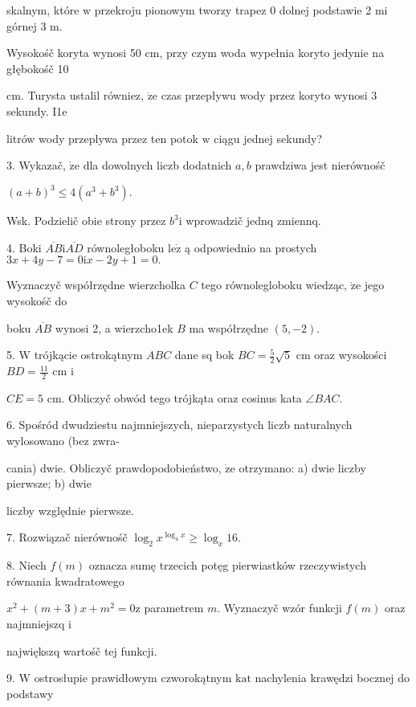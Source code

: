 \documentclass[a4paper,12pt]{article}
\begin{document}
skalnym, które $\mathrm{w}$ przekroju pionowym tworzy trapez $0$ dolnej podstawie 2 $\mathrm{m}\mathrm{i}$ górnej 3 $\mathrm{m}.$

Wysokośč koryta wynosi 50 cm, przy czym woda wypełnia koryto jedynie na głębokośč 10

cm. Turysta ustalil równiez, $\dot{\mathrm{z}}\mathrm{e}$ czas przepływu wody przez koryto wynosi 3 sekundy. I1e

litrów wody przeplywa przez ten potok $\mathrm{w}$ ciągu jednej sekundy?

3. Wykazač, $\dot{\mathrm{z}}\mathrm{e}$ dla dowolnych liczb dodatnich $a, b$ prawdziwa jest nierównośč

$(a+b)^{3}\leq 4(a^{3}+b^{3}).$

Wsk. Podzielič obie strony przez $b^{3}\mathrm{i}$ wprowadzič jednq zmiennq.

4. Boki $\overline{AB}\mathrm{i}\overline{AD}$ równoległoboku $\mathrm{l}\mathrm{e}\dot{\mathrm{z}}$ ą odpowiednio na prostych $3x+4y-7=0\mathrm{i}x-2y+1=0.$

Wyznaczyč współrzędne wierzcholka $C$ tego równolegloboku wiedząc, $\dot{\mathrm{z}}\mathrm{e}$ jego wysokośč do

boku $\overline{AB}$ wynosi 2, a wierzcho1ek $B$ ma współrzędne $(5,-2).$

5. $\mathrm{W}$ trójkącie ostrokątnym $ABC$ dane sq bok $BC=\displaystyle \frac{5}{2}\sqrt{5}$ cm oraz wysokości $BD=\displaystyle \frac{11}{2}$ cm $\mathrm{i}$

$CE=5$ cm. Obliczyč obwód tego trójkąta oraz cosinus kata $\angle BAC.$

6. Spośród dwudziestu najmniejszych, nieparzystych liczb naturalnych wylosowano (bez zwra-

cania) dwie. Obliczyč prawdopodobieństwo, $\dot{\mathrm{z}}\mathrm{e}$ otrzymano: a) dwie liczby pierwsze; b) dwie

liczby względnie pierwsze.

7. Rozwiązač nierównośč $\log_{2} x^{\log_{4}x}\geq\log_{x}16.$

8. Niech $f(m)$ oznacza sumę trzecich potęg pierwiastków rzeczywistych równania kwadratowego

$x^{2}+(m+3)x+m^{2}=0\mathrm{z}$ parametrem $m$. Wyznaczyč wzór funkcji $f(m)$ oraz najmniejszq $\mathrm{i}$

największq wartośč tej funkcji.

9. $\mathrm{W}$ ostrosłupie prawidłowym czworokątnym $\mathrm{k}\mathrm{a}\mathrm{t}$ nachylenia krawędzi bocznej do podstawy
\end{document}
